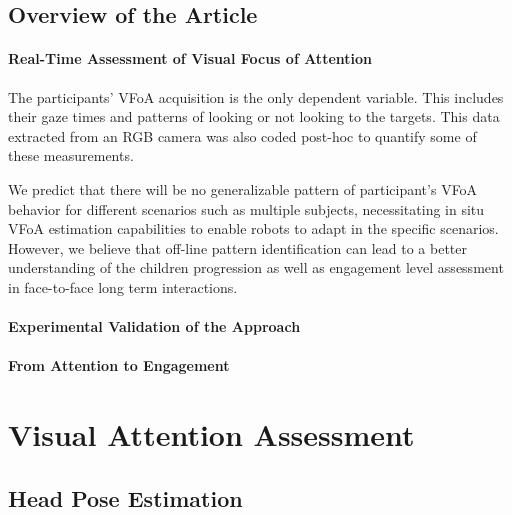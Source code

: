 \documentclass{sig-alternate}
\begin{document}
\subsection*{Overview of the Article}

\paragraph{Real-Time Assessment of Visual Focus of Attention}

The participants' VFoA acquisition is the only dependent variable. This includes
their gaze times and patterns of looking or not looking to the targets. This
data extracted from an RGB camera was also coded post-hoc to quantify some of
these measurements.

We predict that there will be no generalizable pattern of participant's VFoA
behavior for different scenarios such as multiple subjects, necessitating in
situ VFoA estimation capabilities to enable robots to adapt in the specific
scenarios. However, we believe that off-line pattern identification can lead to
a better understanding of the children progression as well as engagement level
assessment in face-to-face long term interactions.



\paragraph{Experimental Validation of the Approach}


\paragraph{From Attention to Engagement}


\section{Visual Attention Assessment}

\subsection{Head Pose Estimation}
\end{document}
